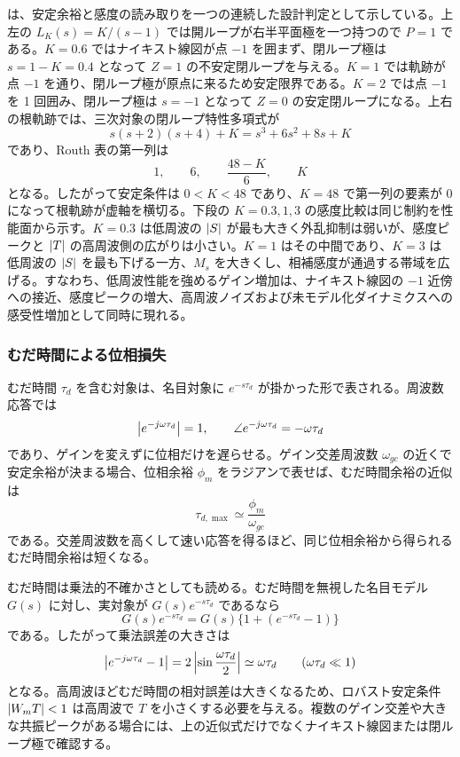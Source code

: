  は、安定余裕と感度の読み取りを一つの連続した設計判定として示している。上左の $L_K(s)=K/(s-1)$ では開ループが右半平面極を一つ持つので $P=1$ である。$K=0.6$ ではナイキスト線図が点 $-1$ を囲まず、閉ループ極は $s=1-K=0.4$ となって $Z=1$ の不安定閉ループを与える。$K=1$ では軌跡が点 $-1$ を通り、閉ループ極が原点に来るため安定限界である。$K=2$ では点 $-1$ を 1 回囲み、閉ループ極は $s=-1$ となって $Z=0$ の安定閉ループになる。上右の根軌跡では、三次対象の閉ループ特性多項式が
\begin{equation}
  s(s+2)(s+4)+K=s^3+6s^2+8s+K
\end{equation}
であり、Routh 表の第一列は
\begin{equation}
  1,\qquad 6,\qquad \frac{48-K}{6},\qquad K
\end{equation}
となる。したがって安定条件は $0<K<48$ であり、$K=48$ で第一列の要素が 0 になって根軌跡が虚軸を横切る。下段の $K=0.3,1,3$ の感度比較は同じ制約を性能面から示す。$K=0.3$ は低周波の $\left|S\right|$ が最も大きく外乱抑制は弱いが、感度ピークと $\left|T\right|$ の高周波側の広がりは小さい。$K=1$ はその中間であり、$K=3$ は低周波の $\left|S\right|$ を最も下げる一方、$M_s$ を大きくし、相補感度が通過する帯域を広げる。すなわち、低周波性能を強めるゲイン増加は、ナイキスト線図の $-1$ 近傍への接近、感度ピークの増大、高周波ノイズおよび未モデル化ダイナミクスへの感受性増加として同時に現れる。

\subsubsection{むだ時間による位相損失}

むだ時間 $\tau_d$ を含む対象は、名目対象に $e^{-s\tau_d}$ が掛かった形で表される。周波数応答では
\begin{equation}
  \left|e^{-j\omega\tau_d}\right|=1,\qquad
  \angle e^{-j\omega\tau_d}=-\omega\tau_d
\end{equation}
であり、ゲインを変えずに位相だけを遅らせる。ゲイン交差周波数 $\omega_{gc}$ の近くで安定余裕が決まる場合、位相余裕 $\phi_m$ をラジアンで表せば、むだ時間余裕の近似は
\begin{equation}
  \tau_{d,\max}\simeq\frac{\phi_m}{\omega_{gc}}
\end{equation}
である。交差周波数を高くして速い応答を得るほど、同じ位相余裕から得られるむだ時間余裕は短くなる。

むだ時間は乗法的不確かさとしても読める。むだ時間を無視した名目モデル $G(s)$ に対し、実対象が $G(s)e^{-s\tau_d}$ であるなら
\begin{equation}
  G(s)e^{-s\tau_d}
  =G(s)\{1+(e^{-s\tau_d}-1)\}
\end{equation}
である。したがって乗法誤差の大きさは
\begin{equation}
  \left|e^{-j\omega\tau_d}-1\right|
  =2\left|\sin\frac{\omega\tau_d}{2}\right|
  \simeq \omega\tau_d
  \qquad (\omega\tau_d\ll1)
\end{equation}
となる。高周波ほどむだ時間の相対誤差は大きくなるため、ロバスト安定条件 $\left|W_mT\right|<1$ は高周波で $T$ を小さくする必要を与える。複数のゲイン交差や大きな共振ピークがある場合には、上の近似式だけでなくナイキスト線図または閉ループ極で確認する。

